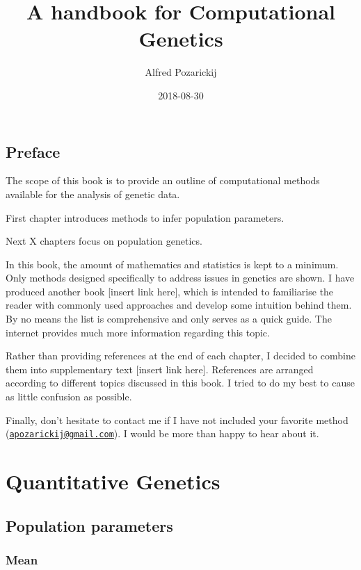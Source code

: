 \documentclass[]{book}
\title{A handbook for Computational Genetics}
\author{Alfred Pozarickij}
\date{2018-08-30}
\theoremstyle{definition}
\theoremstyle{definition}
\theoremstyle{definition}
\theoremstyle{remark}
\begin{document}
\maketitle

{
\setcounter{tocdepth}{1}
\tableofcontents
}
\chapter*{Preface}\label{preface}

The scope of this book is to provide an outline of computational methods
available for the analysis of genetic data.

First chapter introduces methods to infer population parameters.

Next X chapters focus on population genetics.

In this book, the amount of mathematics and statistics is kept to a
minimum. Only methods designed specifically to address issues in
genetics are shown. I have produced another book {[}insert link here{]},
which is intended to familiarise the reader with commonly used
approaches and develop some intuition behind them. By no means the list
is comprehensive and only serves as a quick guide. The internet provides
much more information regarding this topic.

Rather than providing references at the end of each chapter, I decided
to combine them into supplementary text {[}insert link here{]}.
References are arranged according to different topics discussed in this
book. I tried to do my best to cause as little confusion as possible.

Finally, don't hesitate to contact me if I have not included your
favorite method
(\href{mailto:apozarickij@gmail.com}{\nolinkurl{apozarickij@gmail.com}}).
I would be more than happy to hear about it.

\part{Quantitative
Genetics}\label{part-quantitative-genetics}

\chapter{Population parameters}\label{population-parameters}

\section{Mean}\label{mean}
\end{document}
